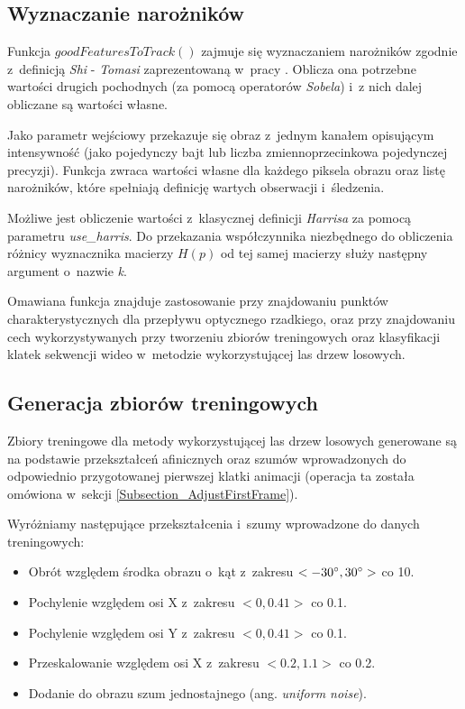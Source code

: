   \subsection{Wyznaczanie narożników}
  Funkcja $goodFeaturesToTrack()$ zajmuje się wyznaczaniem narożników zgodnie z~definicją \textit{Shi} - \textit{Tomasi} zaprezentowaną w~pracy \cite{GoodFeaturesToTrack94}. Oblicza ona potrzebne wartości drugich pochodnych (za pomocą operatorów \textit{Sobela}) i~z nich dalej obliczane są wartości własne.

  Jako parametr wejściowy przekazuje się obraz z~jednym kanałem opisującym intensywność (jako pojedynczy bajt lub liczba zmiennoprzecinkowa pojedynczej precyzji). Funkcja zwraca wartości własne dla każdego piksela obrazu oraz listę narożników, które spełniają definicję wartych obserwacji i~śledzenia.

  Możliwe jest obliczenie wartości z~klasycznej definicji \textit{Harrisa} za pomocą parametru \textit{use\_harris}. Do przekazania współczynnika niezbędnego do obliczenia różnicy wyznacznika macierzy $H(p)$ od tej samej macierzy służy następny argument o~nazwie \textit{k}.

  Omawiana funkcja znajduje zastosowanie przy znajdowaniu punktów charakterystycznych dla przepływu optycznego rzadkiego, oraz przy znajdowaniu cech wykorzystywanych przy tworzeniu zbiorów treningowych oraz klasyfikacji klatek sekwencji wideo w~metodzie wykorzystującej las drzew losowych.

  \subsection{Generacja zbiorów treningowych}
  Zbiory treningowe dla metody wykorzystującej las drzew losowych generowane są na podstawie przekształceń afinicznych oraz szumów wprowadzonych do odpowiednio przygotowanej pierwszej klatki animacji (operacja ta została omówiona w~sekcji \ref{Subsection_AdjustFirstFrame}).

  Wyróżniamy następujące przekształcenia i~szumy wprowadzone do danych treningowych:

  \begin{itemize}
    \item Obrót względem środka obrazu o~kąt z~zakresu $<-30^{\circ}\protect, 30^{\circ}\protect>$ co 10\degree.
    \item Pochylenie względem osi X z~zakresu $<0, 0.41>$ co 0.1.
    \item Pochylenie względem osi Y z~zakresu $<0, 0.41>$ co 0.1.
    \item Przeskalowanie względem osi X z~zakresu $<0.2, 1.1>$ co 0.2.
    \item Dodanie do obrazu szum jednostajnego (ang. \textit{uniform noise}).
  \end{itemize}

